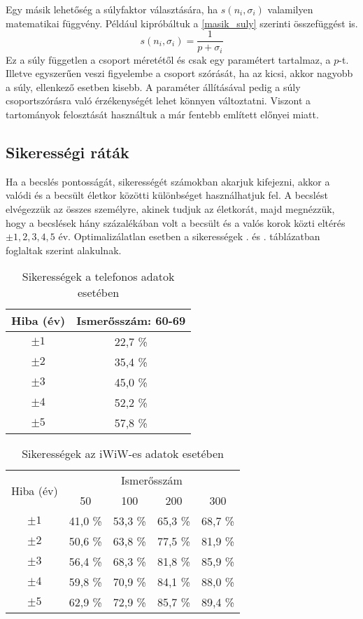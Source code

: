 \documentclass[12pt]{article}
\begin{document}
Egy másik lehetőség a súlyfaktor választására, ha $s(n_i, \sigma_i)$ valamilyen matematikai függvény. Például kipróbáltuk a \eqref{masik_suly} szerinti összefüggést is.
\begin{equation} \label{masik_suly}
	s(n_i, \sigma_i) = \frac{1}{p + \sigma_i}
\end{equation}
Ez a súly független a csoport méretétől és csak egy paramétert tartalmaz, a $p$-t. Illetve egyszerűen veszi figyelembe a csoport szórását, ha az kicsi, akkor nagyobb a súly, ellenkező esetben kisebb. A paraméter állításával pedig a súly csoportszórásra való érzékenységét lehet könnyen változtatni. Viszont a tartományok felosztását használtuk a már fentebb említett előnyei miatt.

\subsection{Sikerességi ráták}
Ha a becslés pontosságát, sikerességét számokban akarjuk kifejezni, akkor a valódi és a becsült életkor közötti különbséget használhatjuk fel. A becslést elvégezzük az összes személyre, akinek tudjuk az életkorát, majd megnézzük, hogy a becslések hány százalékában volt a becsült és a valós korok közti eltérés $\pm 1, 2,3,4,5$ év. Optimalizálatlan esetben a sikerességek . és . táblázatban foglaltak szerint alakulnak.
\begin{table}[H]
	\centering
	\begin{tabular}{|c|c|}
		\hline
		Hiba (év) & Ismerősszám: 60-69 \\
		\hline
		$\pm 1$ & 22,7 \% \\
		\hline
		$\pm 2$ & 35,4 \% \\
		\hline
		$\pm 3$ & 45,0 \% \\
		\hline
		$\pm 4$ & 52,2 \% \\
		\hline
		$\pm 5$ & 57,8 \% \\
		\hline
	\end{tabular}
	\caption{Sikerességek a telefonos adatok esetében}
	\label{telefon_sikeresseg_nemopt} %
\end{table}
\begin{table}[H]
	\centering
	\begin{tabular}{|c|c|c|c|c|}
		\hline
		\multirow{2}{*}{Hiba (év)} & \multicolumn{4}{|c|}{Ismerősszám} \\ \cline{2-5} & 50 & 100 & 200 & 300 \\
		\hline
		$\pm 1$ & 41,0 \% & 53,3 \% & 65,3 \% & 68,7 \% \\
		\hline
		$\pm 2$ & 50,6 \% & 63,8 \% & 77,5 \% & 81,9 \% \\
		\hline
		$\pm 3$ & 56,4 \% & 68,3 \% & 81,8 \% & 85,9 \% \\
		\hline
		$\pm 4$ & 59,8 \% & 70,9 \% & 84,1 \% & 88,0 \% \\
		\hline
		$\pm 5$ & 62,9 \% & 72,9 \% & 85,7 \% & 89,4 \% \\
		\hline
	\end{tabular}
	\caption{Sikerességek az iWiW-es adatok esetében}
	\label{iwiw_sikeresseg_nemopt}
\end{table}
\end{document}
